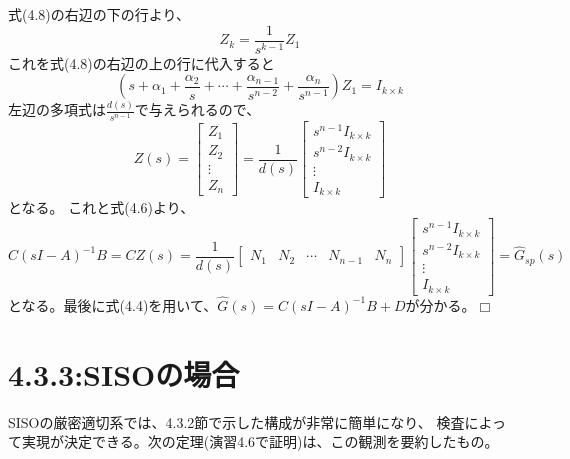 \documentclass{jsarticle}
\begin{document}
式(4.8)の右辺の下の行より、
\begin{equation}
  Z_k = \frac{1}{s^{k-1}}Z_1
\end{equation}
これを式(4.8)の右辺の上の行に代入すると
\begin{equation}
  \left(s+\alpha_{1}+\frac{\alpha_{2}}{s}+\cdots+\frac{\alpha_{n-1}}{s^{n-2}}+\frac{\alpha_{n}}{s^{n-1}}\right) Z_{1}=I_{k \times k}
\end{equation}
左辺の多項式は$\frac{d(s)}{s^{n-1}}$で与えられるので、
\begin{equation}
  Z(s)=\left[\begin{array}{c}
  Z_{1} \\
  Z_{2} \\
  \vdots \\
  Z_{n}
  \end{array}\right]=\frac{1}{d(s)}\left[\begin{array}{c}
  s^{n-1} I_{k \times k} \\
  s^{n-2} I_{k \times k} \\
  \vdots \\
  I_{k \times k}
  \end{array}\right]
\end{equation}
となる。 
これと式(4.6)より、
\begin{equation}
  C(s I-A)^{-1} B=C Z(s)=\frac{1}{d(s)}\left[\begin{array}{lllll}
  N_{1} & N_{2} & \cdots & N_{n-1} & N_{n}
  \end{array}\right]\left[\begin{array}{c}
  s^{n-1} I_{k \times k} \\
  s^{n-2} I_{k \times k} \\
  \vdots \\
  I_{k \times k}
  \end{array}\right]=\hat{G}_{s p}(s)
\end{equation}
となる。最後に式(4.4)を用いて、$\hat{G}(s) = C(sI-A)^{-1}B+D$が分かる。$\Box$

\section*{4.3.3:SISOの場合} 
SISOの厳密適切系では、4.3.2節で示した構成が非常に簡単になり、
検査によって実現が決定できる。次の定理(演習4.6で証明)は、この観測を要約したもの。
\end{document}
